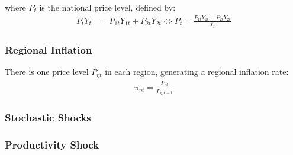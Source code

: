 \documentclass[../thesis.tex]{subfiles}
\begin{document}
where $P_t$ is the national price level, defined by:
\begin{align}
	P_{t} Y_{t} &= P_{1t} Y_{1t} + P_{2t} Y_{2t} \iff P_{t} = \frac{P_{1t} Y_{1t} + P_{2t} Y_{2t}}{Y_{t}} \label{eq:national-price-level}
\end{align}

\begin{comment}
	\begin{align}
		P_{t} Y_{t} &= P_{1t} Y_{1t} + P_{2t} Y_{2t} \implies \nonumber \\
		P_{t} &= \frac{Y_{1t}}{Y_{t}} P_{1t} + \frac{Y_{2t}}{Y_{t}} P_{2t} \implies \nonumber \\
		P_{t} &= \theta_{P1} P_{1t} + (1 -\theta_{P1}) P_{2t} %
	\end{align}
	
	where $\theta_{P1}$ and $(1-\theta_{P1})$ are the price level weights of regions 1 and 2 in the national price level composition, respectively:
	\begin{align}
		\left\langle \begin{matrix} \theta_{P1} & (1-\theta_{P1}) \end{matrix} \right\rangle \coloneq \left\langle \begin{matrix} \frac{Y_{1t}}{Yt} & \frac{Y_{2t}}{Yt} \end{matrix} \right\rangle \label{eq:reg-ss-P1-P2-weight-in-P}
	\end{align}
\end{comment}

\subsubsection*{Regional Inflation}

There is one price level $P_{\eta t}$ in each region, generating a regional inflation rate:
\begin{align}
	\pi_{\eta t} = \frac{P_{\eta t}}{P_{\eta, t-1}} \label{eq:regional-inflation}
\end{align}


\subsubsection{Stochastic Shocks}\label{sec:reg-stochastic-shocks}

\subsubsection*{Productivity Shock} \label{sec:reg-productivity-shock}
\end{document}
